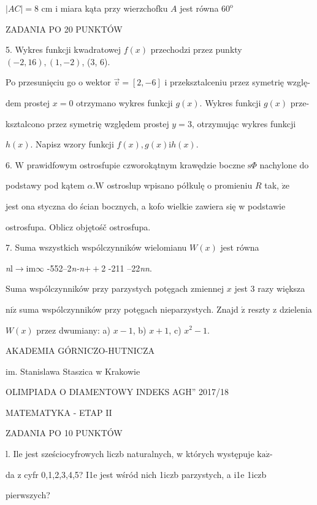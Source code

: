 \documentclass[a4paper,12pt]{article}
\begin{document}
$|AC|=8$ cm i miara kąta przy wierzchofku $A$ jest równa $60^{\mathrm{o}}$

ZADANIA PO 20 PUNKTÓW

5. Wykres funkcji kwadratowej $f(x)$ przechodzi przez punkty $(-2,16), (1,-2)$, (3, 6).

Po przesunięciu go o wektor $\vec{v}=[2,-6]$ i przeksztalceniu przez symetrię wzglę-

dem prostej $x=0$ otrzymano wykres funkcji $g(x)$. Wykres funkcji $g(x)$ prze-

ksztalcono przez symetrię względem prostej $y=3$, otrzymując wykres funkcji

$h(x)$. Napisz wzory funkcji $f(x), g(x)\mathrm{i}h(x).$

6. $\mathrm{W}$ prawidfowym ostrosfupie czworokątnym krawędzie boczne $\mathrm{s}\Phi$ nachylone do

podstawy pod kątem $\alpha. \mathrm{W}$ ostroslup wpisano półkulę o promieniu $R$ tak, $\dot{\mathrm{z}}\mathrm{e}$

jest ona styczna do ścian bocznych, a kofo wielkie zawiera się w podstawie

ostrosfupa. Oblicz objętośč ostrosfupa.

7. Suma wszystkich wspólczynników wielomianu $W(x)$ jest równa

{\it n}l$\rightarrow$im$\infty$ -552--2{\it n-n}$++$2 -211 --22{\it nn}.

Suma wspólczynników przy parzystych potęgach zmiennej $x$ jest 3 razy większa

$\mathrm{n}\mathrm{i}\dot{\mathrm{z}}$ suma wspólczynników przy potęgach nieparzystych. Znajd $\acute{\mathrm{z}}$ reszty z dzielenia

$W(x)$ przez dwumiany: a) $x-1$, b) $x+1$, c) $x^{2}-1.$






AKADEMIA GÓRNICZO-HUTNICZA

im. Stanislawa Staszica w Krakowie

OLIMPIADA O DIAMENTOWY INDEKS AGH'' 2017/18

MATEMATYKA - ETAP II

ZADANIA PO 10 PUNKTÓW

l. Ile jest sześciocyfrowych liczb naturalnych, w których występuje $\mathrm{k}\mathrm{a}\dot{\mathrm{z}}$-

da z cyfr 0,1,2,3,4,5? I1e jest wśród nich 1iczb parzystych, a i1e 1iczb

pierwszych?
\end{document}
